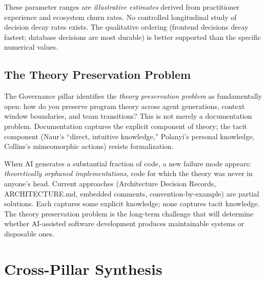 \documentclass[11pt, a4paper, logo, copyright]{googledeepmind}
\begin{document}
These parameter ranges are \emph{illustrative estimates} derived from practitioner experience and ecosystem churn rates. No controlled longitudinal study of decision decay rates exists. The qualitative ordering (frontend decisions decay fastest; database decisions are most durable) is better supported than the specific numerical values.

\subsection{The Theory Preservation Problem}

The Governance pillar identifies the \emph{theory preservation problem} as fundamentally open: how do you preserve program theory across agent generations, context window boundaries, and team transitions? This is not merely a documentation problem. Documentation captures the explicit component of theory; the tacit component (Naur's ``direct, intuitive knowledge,'' Polanyi's personal knowledge, Collins's mimeomorphic actions) resists formalization.

When AI generates a substantial fraction of code, a new failure mode appears: \emph{theoretically orphaned implementations}, code for which the theory was never in anyone's head. Current approaches (Architecture Decision Records, ARCHITECTURE.md, embedded comments, convention-by-example) are partial solutions. Each captures some explicit knowledge; none captures tacit knowledge. The theory preservation problem is the long-term challenge that will determine whether AI-assisted software development produces maintainable systems or disposable ones.


\section{Cross-Pillar Synthesis}
\label{sec:synthesis}
\end{document}
